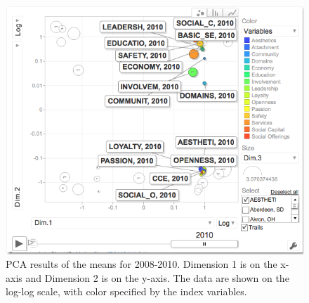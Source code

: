 \documentclass[11pt]{asaproc}
\begin{document}
\begin{figure}[h]
\begin{framed}
\hspace{0.5cm}
\begin{minipage}[b]{0.45\linewidth}
\centering
\includegraphics[width=\textwidth]{pcameans10.png}
\end{minipage}
\hspace{0.5cm}
\begin{minipage}[b]{0.45\linewidth}
\centering
\caption{PCA results of the means for 2008-2010. 
Dimension 1 is on the x-axis and Dimension 2 is on the y-axis. 
The data are shown on the log-log scale, 
with color specified by the index variables.}
\label{fig:pcaMCmeans}
\end{minipage}
\end{framed}
\end{figure}
\end{document}
